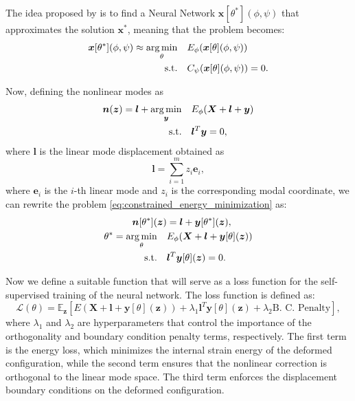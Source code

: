 The idea proposed by \cite{Wang_Du_Coros_Thomaszewski_2024} is to find a Neural Network \( \bm{x}[\theta^*](\phi, \psi) \) that approximates the solution \( \bm{x}^* \), meaning that the problem becomes:
\begin{align*}
    \bm{x}[\theta^*](\phi, \psi) \approx \underset{\theta}{\operatorname*{arg\,min}} \quad & E_\phi(\bm{x}[\theta](\phi, \psi)) \\
    \text{s.t.} \quad & C_\psi(\bm{x}[\theta](\phi, \psi)) = 0.
\end{align*}

Now, defining the nonlinear modes as 
\begin{align}
    \bm{n}(\bm{z}) = \bm{l} + \operatorname*{arg\,min}_{\bm{y}} \quad & E_\phi(\bm{X} + \bm{l} + \bm{y}) \\ 
    \text{s.t.} \quad & \bm{l}^T \bm{y} = 0,
\end{align}
where \( \bm{l} \) is the linear mode displacement obtained as
\begin{equation}
    \bm{l} = \sum_{i=1}^m z_i \bm{e}_i,
\end{equation}
where \( \bm{e}_i \) is the $i$-th linear mode and \( z_i \) is the corresponding modal coordinate, we can rewrite the problem \ref{eq:constrained_energy_minimization} as:
\begin{align*}
    \bm{n}[\theta^*](\bm{z}) &= \bm{l} + \bm{y}[\theta^*](\bm{z}), \\
    \theta^* = \underset{\theta}{\operatorname*{arg\,min}} \quad & E_\phi(\bm{X} + \bm{l} + \bm{y}[\theta](\bm{z})) \\
    \text{s.t.} \quad & \bm{l}^T \bm{y}[\theta](\bm{z}) = 0.
\end{align*}

Now we define a suitable function that will serve as a loss function for the self-supervised training of the neural network. The loss function is defined as:
\begin{equation}
    \mathcal{L}(\theta) = \mathbb{E}_{\bm{z}} \left[ E(\bm{X} + \bm{l} + \bm{y}[\theta](\bm{z})) + \lambda_1 \bm{l}^T \bm{y}[\theta](\bm{z}) + \lambda_2 \text{B. C. Penalty} \right],
\end{equation}
where \( \lambda_1 \) and \( \lambda_2 \) are hyperparameters that control the importance of the orthogonality and boundary condition penalty terms, respectively. The first term is the energy loss, which minimizes the internal strain energy of the deformed configuration, while the second term ensures that the nonlinear correction is orthogonal to the linear mode space. The third term enforces the displacement boundary conditions on the deformed configuration.

